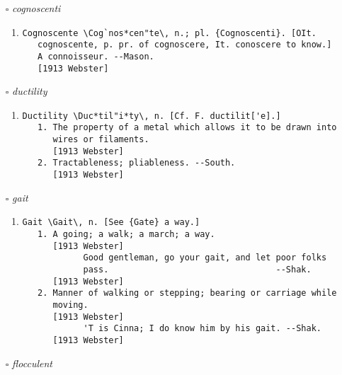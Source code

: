 \documentclass{article}
\begin{document}
\begin{itemize}
\begin{enumerate}
\item{
\begin{lstlisting}
Confabulate \Con*fab"u*late\, v. i. [imp. & p. p.
   {Confabulated}; p. pr. & vb. n. {Confabulating}.] [L.
   confabulatus, p. p. of confabulary, to converse together;
   con- + fabulary to speak, fr. fabula. See {Fable}.]
   To talk familiarly together; to chat; to prattle.
   [1913 Webster]
         I shall not ask Jean Jaques Rousseau
         If birds confabulate or no.              --Cowper.
   [1913 Webster]
\end{lstlisting}}
\end{enumerate}
\item[$\square$] \emph{ cognoscenti }
\begin{enumerate}
\item{
\begin{lstlisting}
Cognoscente \Cog`nos*cen"te\, n.; pl. {Cognoscenti}. [OIt.
   cognoscente, p. pr. of cognoscere, It. conoscere to know.]
   A connoisseur. --Mason.
   [1913 Webster]
\end{lstlisting}}
\end{enumerate}
\item[$\square$] \emph{ ductility }
\begin{enumerate}
\item{
\begin{lstlisting}
Ductility \Duc*til"i*ty\, n. [Cf. F. ductilit['e].]
   1. The property of a metal which allows it to be drawn into
      wires or filaments.
      [1913 Webster]
   2. Tractableness; pliableness. --South.
      [1913 Webster]
\end{lstlisting}}
\end{enumerate}
\item[$\square$] \emph{ gait }
\begin{enumerate}
\item{
\begin{lstlisting}
Gait \Gait\, n. [See {Gate} a way.]
   1. A going; a walk; a march; a way.
      [1913 Webster]
            Good gentleman, go your gait, and let poor folks
            pass.                                 --Shak.
      [1913 Webster]
   2. Manner of walking or stepping; bearing or carriage while
      moving.
      [1913 Webster]
            'T is Cinna; I do know him by his gait. --Shak.
      [1913 Webster]
\end{lstlisting}}
\end{enumerate}
\item[$\square$] \emph{ flocculent }
\begin{enumerate}

\end{enumerate}
\end{itemize}
\end{document}
